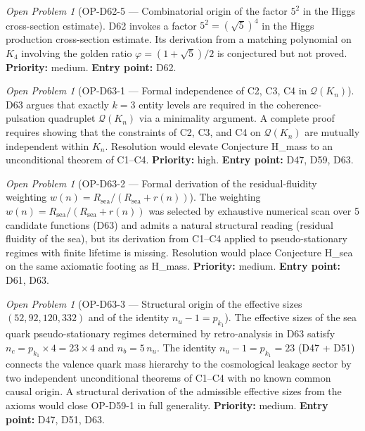 \documentclass[11pt,a4paper]{article}
\theoremstyle{plain}
\theoremstyle{definition}
\theoremstyle{remark}
\newtheorem{openproblem}[theorem]{Open Problem}
\begin{document}
\begin{openproblem}[OP-D62-5 --- Combinatorial origin of the factor $5^2$ in the Higgs cross-section estimate]
\label{op:D62five}
D62 invokes a factor $5^2 = (\sqrt{5})^4$ in the Higgs production cross-section estimate. Its derivation from a matching polynomial on $K_4$ involving the golden ratio $\varphi = (1+\sqrt{5})/2$ is conjectured but not proved. \textbf{Priority:} medium. \textbf{Entry point:} D62.
\end{openproblem}

\begin{openproblem}[OP-D63-1 --- Formal independence of C2, C3, C4 in $\mathcal{Q}(K_n)$]
\label{op:D63one}
D63 argues that exactly $k=3$ entity levels are required in the coherence-pulsation quadruplet $\mathcal{Q}(K_n)$ via a minimality argument. A complete proof requires showing that the constraints of C2, C3, and C4 on $\mathcal{Q}(K_n)$ are mutually independent within $K_n$. Resolution would elevate Conjecture H\_mass to an unconditional theorem of C1--C4. \textbf{Priority:} high. \textbf{Entry point:} D47, D59, D63.
\end{openproblem}

\begin{openproblem}[OP-D63-2 --- Formal derivation of the residual-fluidity weighting $w(n) = R_{\mathrm{sea}}/(R_{\mathrm{sea}}+r(n))$]
\label{op:D63two}
The weighting $w(n) = R_{\mathrm{sea}}/(R_{\mathrm{sea}}+r(n))$ was selected by exhaustive numerical scan over 5 candidate functions (D63) and admits a natural structural reading (residual fluidity of the sea), but its derivation from C1--C4 applied to pseudo-stationary regimes with finite lifetime is missing. Resolution would place Conjecture H\_sea on the same axiomatic footing as H\_mass. \textbf{Priority:} medium. \textbf{Entry point:} D61, D63.
\end{openproblem}

\begin{openproblem}[OP-D63-3 --- Structural origin of the effective sizes $(52, 92, 120, 332)$ and of the identity $n_u - 1 = p_{k_1}$]
\label{op:D63three}
The effective sizes of the sea quark pseudo-stationary regimes determined by retro-analysis in D63 satisfy $n_c = p_{k_1}\times 4 = 23\times 4$ and $n_b = 5\,n_u$. The identity $n_u - 1 = p_{k_1} = 23$ (D47 + D51) connects the valence quark mass hierarchy to the cosmological leakage sector by two independent unconditional theorems of C1--C4 with no known common causal origin. A structural derivation of the admissible effective sizes from the axioms would close OP-D59-1 in full generality. \textbf{Priority:} medium. \textbf{Entry point:} D47, D51, D63.
\end{openproblem}
\end{document}
